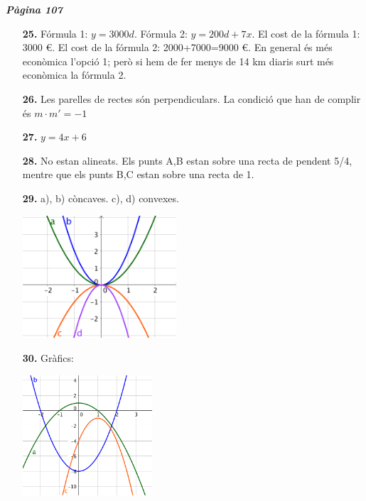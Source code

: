 \documentclass[a4paper, pdf, twoside]{book}
\begin{document}
\begin{multicols}{2}

{\textbf{\em Pàgina 107}} \hrulefill
\begin{enumerate}
\vspace{0.25cm}
\item[\fontfamily{phv}\selectfont\color{blue}\textbf{25. }] 
Fórmula 1: $y=3000d$. Fórmula 2: $y=200d + 7x$. El cost de la fórmula 1: 3000 \euro {}. El cost de la fórmula 2: 2000+7000=9000 \euro {}. En general és més econòmica l'opció 1; però si hem de fer menys de 14 km diaris surt més econòmica la fórmula 2.
 \end{enumerate}
\begin{enumerate}
\vspace{0.25cm}
\item[\fontfamily{phv}\selectfont\color{blue}\textbf{26. }] 
Les parelles de rectes són perpendiculars. La condició que han de complir és $m \cdot m' = -1$
\vspace{0.25cm}
\item[\fontfamily{phv}\selectfont\color{blue}\textbf{27. }] 
$y=4x+6$
\vspace{0.25cm}
\item[\fontfamily{phv}\selectfont\color{blue}\textbf{28. }] 
No estan alineats. Els punts A,B estan sobre una recta de pendent 5/4, mentre que els punts B,C estan sobre una recta de 1.
\vspace{0.25cm}
\item[\fontfamily{phv}\selectfont\color{blue}\textbf{29. }] 
a), b) còncaves. c), d) convexes.\par \includegraphics [width=0.45\textwidth ]{img-sol/t8-29}
\vspace{0.25cm}
\item[\fontfamily{phv}\selectfont\color{blue}\textbf{30. }] 
Gràfics:\par \includegraphics [width=0.38\textwidth ]{img-sol/t8-30}
 \end{enumerate}
\vspace{0.3cm}


\end{multicols}
\end{document}
